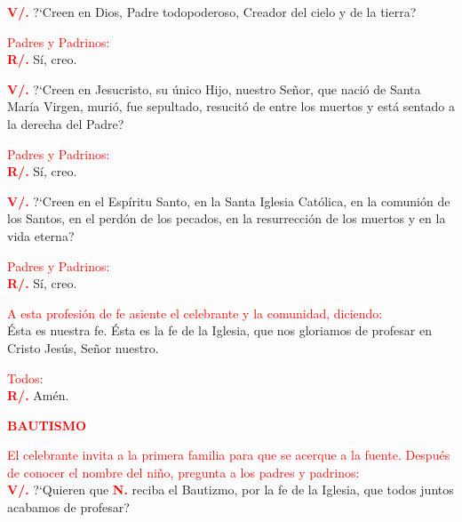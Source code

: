 \documentclass[12pt, letterpaper, spanish]{article}
\begin{document}
  \noindent
  \Large {\bfseries \textcolor{red}{V/.}} \hspace{0.5cm} ?`Creen en Dios, Padre todopoderoso, Creador del cielo y de la tierra?

  \large {\textcolor{red}{Padres y Padrinos:}}\\
  \Large {\bfseries \textcolor{red}{R/.}} \hspace{0.5cm} S\'i, creo. 

  \noindent
  \Large {\bfseries \textcolor{red}{V/.}} \hspace{0.5cm} ?`Creen en Jesucristo, su \'unico Hijo, nuestro Se\~nor, que naci\'o de Santa Mar\'ia Virgen, muri\'o, fue sepultado, resucit\'o de entre los muertos y est\'a sentado a la derecha del Padre?

  \large {\textcolor{red}{Padres y Padrinos:}}\\
  \Large {\bfseries \textcolor{red}{R/.}} \hspace{0.5cm} S\'i, creo.
  
  \clearpage

  \noindent
  \Large {\bfseries \textcolor{red}{V/.}} \hspace{0.5cm} ?`Creen en el Esp\'iritu Santo, en la Santa Iglesia Cat\'olica, en la comuni\'on de los Santos, en el perd\'on de los pecados, en la resurrecci\'on de los muertos y en la vida eterna?

  \large {\textcolor{red}{Padres y Padrinos:}}\\
  \Large {\bfseries \textcolor{red}{R/.}} \hspace{0.5cm} S\'i, creo. 

  \large {\textcolor{red}{A esta profesi\'on de fe asiente el celebrante y la comunidad, diciendo:}}\\
  \Large \'Esta es nuestra fe. \'Esta es la fe de la Iglesia, que nos gloriamos de profesar en Cristo Jes\'us, Se\~nor nuestro.

  \large {\textcolor{red}{Todos:}}\\
  \Large {\bfseries \textcolor{red}{R/.}} \hspace{0.5cm} Am\'en. 

  \Large {\bfseries \textcolor{red}{BAUTISMO}} 

  \large {\textcolor{red}{El celebrante invita a la primera familia para que se acerque a la fuente. Despu\'es de conocer el nombre del ni\~no, pregunta a los padres y padrinos:}}\\
  \Large {\bfseries \textcolor{red}{V/.}} \hspace{0.5cm} \Large {?`Quieren que {\bfseries \textcolor{red}{N.}} reciba el Bautizmo, por la fe de la Iglesia, que todos juntos acabamos de profesar?}
\end{document}
